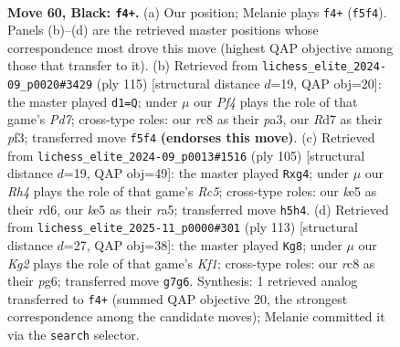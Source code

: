 \documentclass[11pt]{article}
\begin{document}
\clearpage

\begin{figure}[p]\centering
\begin{subfigure}{0.46\textwidth}\centering
\resizebox{\linewidth}{!}{%
\newchessgame
\chessboard[
  setfen={2R5/3r2k1/8/p3Kp1r/8/1P6/3p3P/R7 b - - 1 60},
  showmover=false,
  pgfstyle=straightmove, color=movearrow, markmove={f5-f4}
]}
\caption{}
\end{subfigure}\hfill
\begin{subfigure}{0.46\textwidth}\centering
\resizebox{\linewidth}{!}{%
\newchessgame
\chessboard[
  setfen={8/pp1r2p1/8/8/k7/P3KP1P/3p4/1R6 b - - 3 58},
  showmover=false,
  pgfstyle=straightmove, color=movearrow, markmove={d2-d1}
]}
\caption{}
\end{subfigure}
\\[4pt]
\begin{subfigure}{0.46\textwidth}\centering
\resizebox{\linewidth}{!}{%
\newchessgame
\chessboard[
  setfen={8/8/3RpK2/R7/p1r3P1/P3k3/1P6/4r3 b - - 20 53},
  showmover=false,
  pgfstyle=straightmove, color=movearrow, markmove={c4-g4}
]}
\caption{}
\end{subfigure}\hfill
\begin{subfigure}{0.46\textwidth}\centering
\resizebox{\linewidth}{!}{%
\newchessgame
\chessboard[
  setfen={5k2/R7/6P1/pr3pK1/7p/5P2/8/8 b - - 1 57},
  showmover=false,
  pgfstyle=straightmove, color=movearrow, markmove={f8-g8}
]}
\caption{}
\end{subfigure}
\caption{\textbf{Move 60, Black: \texttt{f4+}.} (a) Our position; Melanie plays \texttt{f4+} (\texttt{f5f4}). Panels (b)--(d) are the retrieved master positions whose correspondence most drove this move (highest QAP objective among those that transfer to it). (b) Retrieved from \texttt{lichess\_elite\_2024-09\_p0020\#3429} (ply 115) [structural distance $d$=19, QAP obj=20]: the master played \texttt{d1=Q}; under $\mu$ our \emph{Pf4} plays the role of that game's \emph{Pd7}; cross-type roles: our \emph{r}c8 as their \emph{p}a3, our \emph{R}d7 as their \emph{p}f3; transferred move \texttt{f5f4} \textbf{(endorses this move)}. (c) Retrieved from \texttt{lichess\_elite\_2024-09\_p0013\#1516} (ply 105) [structural distance $d$=19, QAP obj=49]: the master played \texttt{Rxg4}; under $\mu$ our \emph{Rh4} plays the role of that game's \emph{Rc5}; cross-type roles: our \emph{k}e5 as their \emph{r}d6, our \emph{k}e5 as their \emph{r}a5; transferred move \texttt{h5h4}. (d) Retrieved from \texttt{lichess\_elite\_2025-11\_p0000\#301} (ply 113) [structural distance $d$=27, QAP obj=38]: the master played \texttt{Kg8}; under $\mu$ our \emph{Kg2} plays the role of that game's \emph{Kf1}; cross-type roles: our \emph{r}c8 as their \emph{p}g6; transferred move \texttt{g7g6}. Synthesis: 1 retrieved analog transferred to \texttt{f4+} (summed QAP objective 20, the strongest correspondence among the candidate moves); Melanie committed it via the \texttt{search} selector.}
\label{fig:thought-m119}
\end{figure}
\end{document}
